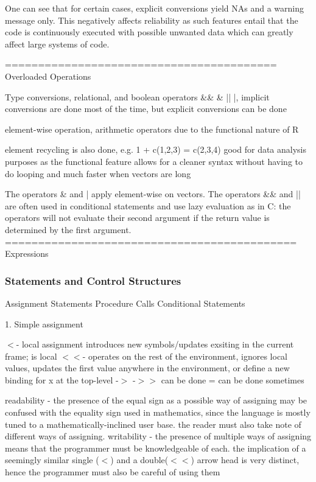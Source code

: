\documentclass[12pt]{article}
\begin{document}
One can see that for certain cases, explicit conversions yield NAs and a warning message only. This negatively affects reliability as such features entail that the code is continuously executed with possible unwanted data which can greatly affect large systems of code.

=========================================
Overloaded Operations



Type conversions, relational, and boolean operators
 \&\& \& || |, implicit conversions are done most of the time, but explicit conversions can be done

 element-wise operation, arithmetic operators due to the functional nature of R

 element recycling is also done, e.g. 1 + c(1,2,3) = c(2,3,4)
 good for data analysis purposes as the functional feature allows for a cleaner syntax without having to do looping and much faster when vectors are long

 The operators \& and | apply element-wise on vectors. The operators \&\& and || are often used in conditional statements and use lazy evaluation as in C: the operators will not evaluate their second argument if the return value is determined by the first argument.
============================================
Expressions

\subsubsection{Statements and Control Structures}

Assignment Statements
Procedure Calls
Conditional Statements

1. Simple assignment

\(<\)- local assignment introduces new symbols/updates exsiting in the current frame; is local
\(<<\)- operates on the rest of the environment, ignores local values, updates the first value anywhere in the environment, or define a new binding for x at the top-level
-\(>\) -\(>>\) can be done
= can be done sometimes

readability - the presence of the equal sign as a possible way of assigning may be confused with the equality sign used in mathematics, since the language is mostly tuned to a mathematically-inclined user base. the reader must also take note of different ways of assigning.
writability - the presence of multiple ways of assigning means that the programmer must be knowledgeable of each. the implication of a seemingly similar single (\(<\)) and a double(\(<<\)) arrow head is very distinct, hence the programmer must also be careful of using them
\end{document}
